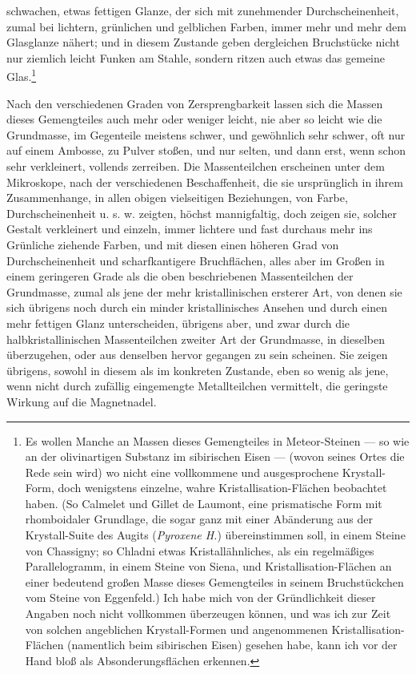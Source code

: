 \documentclass[a4paper, 11pt, oneside, german]{article}
\begin{document}
schwachen, etwas fettigen Glanze, der sich mit zunehmender Durchscheinenheit, zumal bei lichtern, grünlichen und gelblichen Farben, immer mehr und mehr dem Glasglanze nähert; und in diesem Zustande geben dergleichen Bruchstücke nicht nur ziemlich leicht Funken am Stahle, sondern ritzen auch etwas das gemeine Glas.\footnote{Es wollen Manche an Massen dieses Gemengteiles in Meteor-Steinen --- so wie an der olivinartigen Substanz im sibirischen Eisen --- (wovon seines Ortes die Rede sein wird) wo nicht eine vollkommene und ausgesprochene Krystall-Form, doch wenigstens einzelne, wahre Kristallisation-Flächen beobachtet haben. (So Calmelet und Gillet de Laumont, eine prismatische Form mit rhomboidaler Grundlage, die sogar ganz mit einer Abänderung aus der Krystall-Suite des Augits (\emph{Pyroxene H.}) übereinstimmen soll, in einem Steine von Chassigny; so Chladni etwas Kristallähnliches, als ein regelmäßiges Parallelogramm, in einem Steine von Siena, und Kristallisation-Flächen an einer bedeutend großen Masse dieses Gemengteiles in seinem Bruchstückchen vom Steine von Eggenfeld.) Ich habe mich von der Gründlichkeit dieser Angaben noch nicht vollkommen überzeugen können, und was ich zur Zeit von solchen angeblichen Krystall-Formen und angenommenen Kristallisation-Flächen (namentlich beim sibirischen Eisen) gesehen habe, kann ich vor der Hand bloß als Absonderungsflächen erkennen.}

Nach den verschiedenen Graden von Zersprengbarkeit lassen sich die Massen dieses Gemengteiles auch mehr oder weniger leicht, nie aber so leicht wie die Grundmasse, im Gegenteile meistens schwer, und gewöhnlich sehr schwer, oft nur auf einem Ambosse, zu Pulver stoßen, und nur selten, und dann erst, wenn schon sehr verkleinert, vollends zerreiben. Die Massenteilchen erscheinen unter dem Mikroskope, nach der verschiedenen Beschaffenheit, die sie ursprünglich in ihrem Zusammenhange, in allen obigen vielseitigen Beziehungen, von Farbe, Durchscheinenheit u. s. w. zeigten, höchst mannigfaltig, doch zeigen sie, solcher Gestalt verkleinert und einzeln, immer lichtere und fast durchaus mehr ins Grünliche ziehende Farben, und mit diesen einen höheren Grad von Durchscheinenheit und scharfkantigere Bruchflächen, alles aber im Großen in einem geringeren Grade als die oben beschriebenen Massenteilchen der Grundmasse, zumal als jene der mehr kristallinischen ersterer Art, von denen sie sich übrigens noch durch ein minder kristallinisches Ansehen und durch einen mehr fettigen Glanz unterscheiden, übrigens aber, und zwar durch die halbkristallinischen Massenteilchen zweiter Art der Grundmasse, in dieselben überzugehen, oder aus denselben hervor gegangen zu sein scheinen. Sie zeigen übrigens, sowohl in diesem als im konkreten Zustande, eben so wenig als jene, wenn nicht durch zufällig eingemengte Metallteilchen vermittelt, die geringste Wirkung auf die Magnetnadel.
\end{document}
